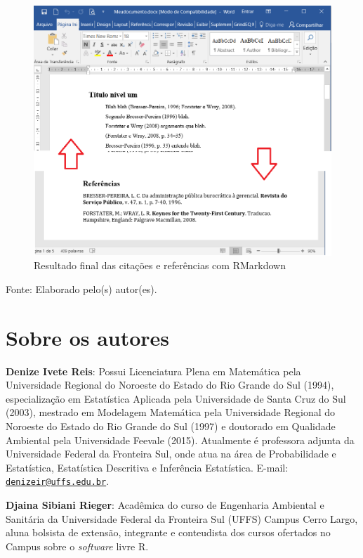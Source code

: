 \documentclass[12pt,portuguese,oneside]{book}
\begin{document}
\begin{figure}[H]

{\centering \includegraphics[width=0.8\linewidth]{rmarkcitarf} 

}

\caption{Resultado final das citações e referências com RMarkdown}\label{fig:rmarkcitarf}
\end{figure}

Fonte: Elaborado pelo(s) autor(es).

\chapter*{Sobre os autores}\label{sobre-os-autores}

\textbf{Denize Ivete Reis}: Possui Licenciatura Plena em Matemática pela
Universidade Regional do Noroeste do Estado do Rio Grande do Sul (1994),
especialização em Estatística Aplicada pela Universidade de Santa Cruz
do Sul (2003), mestrado em Modelagem Matemática pela Universidade
Regional do Noroeste do Estado do Rio Grande do Sul (1997) e doutorado
em Qualidade Ambiental pela Universidade Feevale (2015). Atualmente é
professora adjunta da Universidade Federal da Fronteira Sul, onde atua
na área de Probabilidade e Estatística, Estatística Descritiva e
Inferência Estatística. E-mail:
\href{mailto:denizeir@uffs.edu.br}{\nolinkurl{denizeir@uffs.edu.br}}.

\textbf{Djaina Sibiani Rieger}: Acadêmica do curso de Engenharia
Ambiental e Sanitária da Universidade Federal da Fronteira Sul (UFFS)
Campus Cerro Largo, aluna bolsista de extensão, integrante e conteudista
dos cursos ofertados no Campus sobre o \emph{software} livre R.
\end{document}
